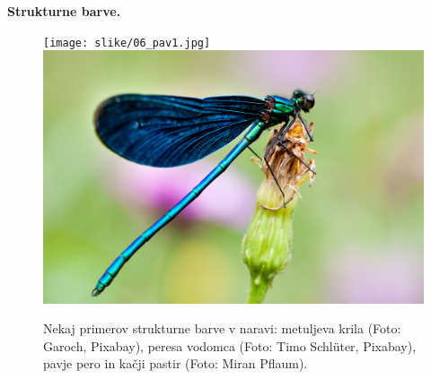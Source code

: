 \begin{example}{\bf Strukturne barve.}
\begin{figure}[!ht]
\texttt{[image: slike/06\_pav1.jpg]}\hfill
\includegraphics[width=7truecm]{slike/06_pastir.jpg}
\caption{Nekaj primerov strukturne barve v naravi: metuljeva krila (Foto: Garoch, Pixabay), peresa vodomca (Foto:
Timo Schl\"uter, Pixabay), pavje pero in kačji pastir (Foto: Miran Pflaum).}
\label{fig:06_FK}
\end{figure}
 
\end{example}







